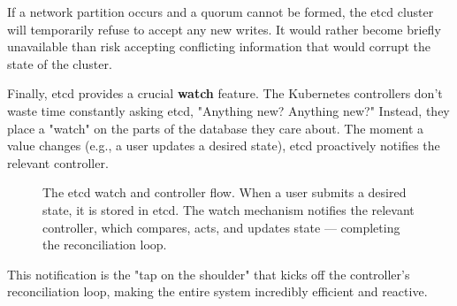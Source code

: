 If a network partition occurs and a quorum cannot be formed, the etcd cluster will temporarily refuse to accept any new writes. It would rather become briefly unavailable than risk accepting conflicting information that would corrupt the state of the cluster.

Finally, etcd provides a crucial \textbf{watch} feature. The Kubernetes controllers don't waste time constantly asking etcd, "Anything new? Anything new?" Instead, they place a "watch" on the parts of the database they care about. The moment a value changes (e.g., a user updates a desired state), etcd proactively notifies the relevant controller.
\begin{figure}[htbp]
\centering

\caption{The etcd watch and controller flow. When a user submits a desired state, it is stored in etcd. The watch mechanism notifies the relevant controller, which compares, acts, and updates state --- completing the reconciliation loop.}
\label{fig:5_6}
\end{figure}


This notification is the "tap on the shoulder" that kicks off the controller's reconciliation loop, making the entire system incredibly efficient and reactive.

